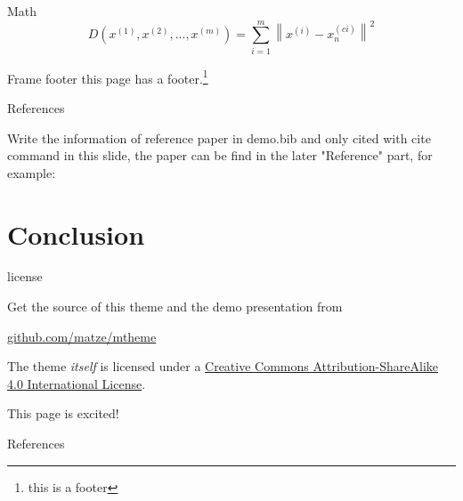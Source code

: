 \documentclass[10pt]{beamer}
\begin{document}
\begin{frame}{Math}
	\[
			D({x^{(1)}},{x^{(2)}},...,{x^{(m)}}) = \sum\limits_{i = 1}^m {{{\left\| {{x^{(i)}} - x_n^{(ci)}} \right\|}^2}} 
	\]
\end{frame}



\begin{frame}[fragile]{Frame footer}
    this page has a footer.\footnote{this is a footer}
\end{frame}


\begin{frame}{References}

	Write the information of reference paper in demo.bib 
	and only cited with cite command in this slide, the paper 
	can be find in the later "Reference" part, for example:

	\cite{knuth92,ConcreteMath,Simpson,Er01,greenwade93}
	
\end{frame}




\section{Conclusion}

\begin{frame}{license}

	Get the source of this theme and the demo presentation from

	\begin{center}
  		\url{github.com/matze/mtheme}
	\end{center}

  	The theme \emph{itself} is licensed under a
  	\href{http://creativecommons.org/licenses/by-sa/4.0/}{Creative Commons
  	Attribution-ShareAlike 4.0 International License}.

  	\begin{center}
  		\ccbysa
  	\end{center}
\end{frame}



\begin{frame}[standout]
  This page is excited! 
\end{frame}



\appendix



\begin{frame}[allowframebreaks]{References}

  
  

\end{frame}
\end{document}
